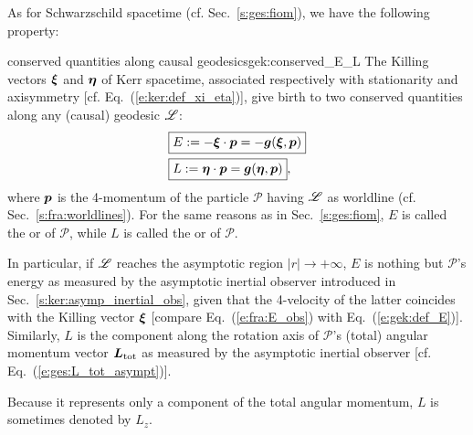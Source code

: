 As for Schwarzschild spacetime (cf. Sec.~\ref{s:ges:fiom}), we have the following
property:
\begin{tprop}{conserved quantities along causal geodesics}{gek:conserved_E_L}
The Killing vectors $\bm{\xi}$ and $\bm{\eta}$ of Kerr spacetime,
associated respectively with
stationarity and axisymmetry [cf. Eq.~(\ref{e:ker:def_xi_eta})],
give birth to two conserved quantities
along any (causal) geodesic $\mathscr{L}$:
\begin{subequations}
\label{e:gek:def_E_L}
\begin{align}
& \fbox{$\displaystyle E := - \bm{\xi}\cdot \bm{p} = - \bm{g}(\bm{\xi},\bm{p}) $} \label{e:gek:def_E} \\
& \fbox{$\displaystyle L := \bm{\eta}\cdot \bm{p} = \bm{g}(\bm{\eta},\bm{p}) $} , \label{e:gek:def_L}
\end{align}
\end{subequations}
where $\bm{p}$ is the 4-momentum of the particle $\mathscr{P}$
having $\mathscr{L}$ as worldline (cf. Sec.~\ref{s:fra:worldlines}).
For the same reasons as in Sec.~\ref{s:ges:fiom}, $E$ is called
the 
or  of $\mathscr{P}$,
while $L$ is called the 
or 
of $\mathscr{P}$.
\end{tprop}
In particular, if $\mathscr{L}$ reaches the asymptotic region $|r|\to+\infty$,
$E$ is nothing but $\mathscr{P}$'s energy as measured by the asymptotic inertial
observer introduced in Sec.~\ref{s:ker:asymp_inertial_obs}, given that
the 4-velocity of the latter coincides with the Killing vector
$\bm{\xi}$
[compare Eq.~(\ref{e:fra:E_obs}) with Eq.~(\ref{e:gek:def_E})].
Similarly, $L$ is the component along the rotation axis of $\mathscr{P}$'s (total) angular momentum vector $\bm{L}_{\rm tot}$
as measured by the asymptotic inertial observer [cf. Eq.~(\ref{e:ges:L_tot_asympt})].

\begin{remark}
Because it represents only a component of the total angular momentum,
$L$ is sometimes denoted by $L_z$.
\end{remark}

